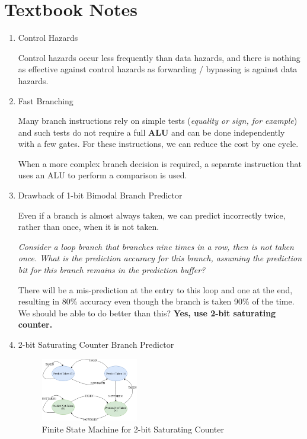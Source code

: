 \documentclass[12pt]{article}
\newenvironment{QandA}{\begin{enumerate}[label=\bfseries\arabic*.]\bfseries}
                      {\end{enumerate}}
\newenvironment{answered}{\par\quad\normalfont}{}
\begin{document}
\newpage 

\section{Textbook Notes}
\begin{QandA}
\item Control Hazards
\begin{answered}
Control hazards occur less frequently than data hazards, and there is nothing as effective against control hazards as forwarding / bypassing is against data hazards.
\end{answered}

\item Fast Branching
\begin{answered}
Many branch instructions rely on simple tests (\textit{equality or sign, for example}) and such tests do not require a full \textbf{ALU} and can be done independently with a few gates. For these instructions, we can reduce the cost by one cycle. 

When a more complex branch decision is required, a separate instruction that uses an ALU to perform a comparison is used.
\end{answered}

\item Drawback of 1-bit Bimodal Branch Predictor
\begin{answered}
Even if a branch is almost always taken, we can predict incorrectly twice, rather than once, when it is not taken. 

\textit{Consider a loop branch that branches nine times in a row, then is not taken once. What is the prediction accuracy for this branch, assuming the prediction bit for this branch remains in the prediction buffer?}

There will be a mis-prediction at the entry to this loop and one at the end, resulting in 80\% accuracy even though the branch is taken 90\% of the time. We should be able to do better than this? \textbf{Yes, use 2-bit saturating counter.}
\end{answered}

\item 2-bit Saturating Counter Branch Predictor
\begin{answered}
\begin{figure}[!ht]
\centering
\includegraphics[width=0.4\textwidth]{chapter7_imgs/2bitsatcounter.png}
\caption{Finite State Machine for 2-bit Saturating Counter}
\label{2bitsatcounter}
\end{figure}
\end{answered}

\end{QandA}
\end{document}
